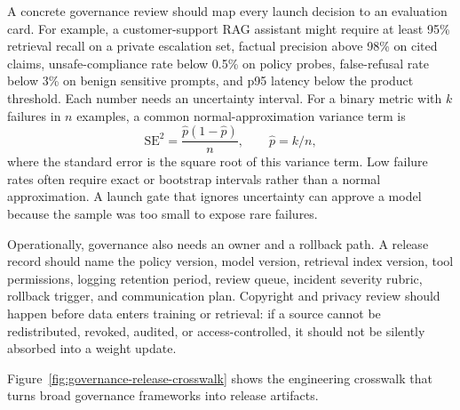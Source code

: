 A concrete governance review should map every launch decision to an evaluation card. For example, a customer-support RAG assistant might require at least 95\% retrieval recall on a private escalation set, factual precision above 98\% on cited claims, unsafe-compliance rate below 0.5\% on policy probes, false-refusal rate below 3\% on benign sensitive prompts, and p95 latency below the product threshold. Each number needs an uncertainty interval. For a binary metric with $k$ failures in $n$ examples, a common normal-approximation variance term is
\[
    \mathrm{SE}^{2}
    =
    \frac{\hat{p}(1-\hat{p})}{n},
    \qquad
    \hat{p}=k/n,
\]
where the standard error is the square root of this variance term. Low failure rates often require exact or bootstrap intervals rather than a normal approximation. A launch gate that ignores uncertainty can approve a model because the sample was too small to expose rare failures.

Operationally, governance also needs an owner and a rollback path. A release record should name the policy version, model version, retrieval index version, tool permissions, logging retention period, review queue, incident severity rubric, rollback trigger, and communication plan. Copyright and privacy review should happen before data enters training or retrieval: if a source cannot be redistributed, revoked, audited, or access-controlled, it should not be silently absorbed into a weight update.

Figure~\ref{fig:governance-release-crosswalk} shows the engineering crosswalk that turns broad governance frameworks into release artifacts.


